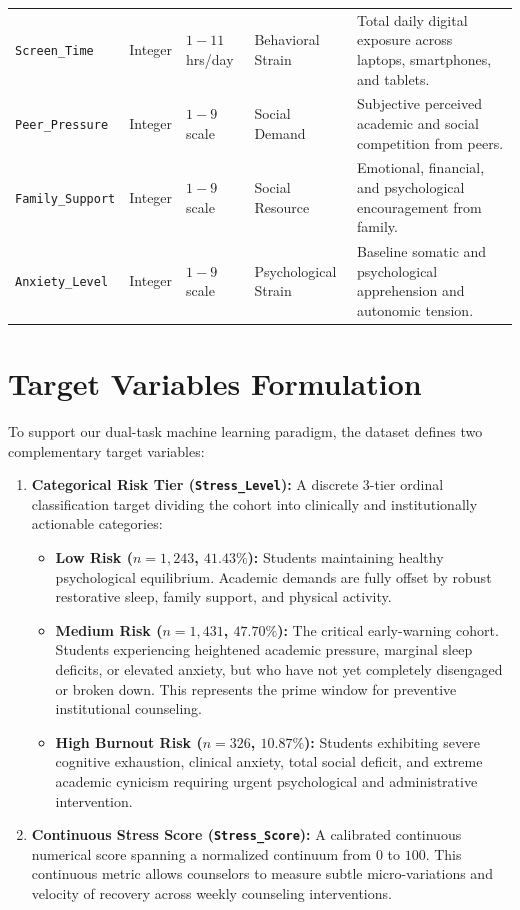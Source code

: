 \documentclass[12pt,a4paper,oneside]{report}
\begin{document}
\begin{table}[H]
\begin{tabularx}{\textwidth}{p{2.8cm}p{1.4cm}p{1.6cm}p{2.2cm}X}
\texttt{Screen\_Time} & Integer & $1 - 11$ hrs/day & Behavioral Strain & Total daily digital exposure across laptops, smartphones, and tablets. \\
\texttt{Peer\_Pressure} & Integer & $1 - 9$ scale & Social Demand & Subjective perceived academic and social competition from peers. \\
\texttt{Family\_Support} & Integer & $1 - 9$ scale & Social Resource & Emotional, financial, and psychological encouragement from family. \\
\texttt{Anxiety\_Level} & Integer & $1 - 9$ scale & Psychological Strain & Baseline somatic and psychological apprehension and autonomic tension. \\
\bottomrule
\end{tabularx}
\end{table}

\section{Target Variables Formulation}
\label{sec:target_variables}
To support our dual-task machine learning paradigm, the dataset defines two complementary target variables:
\begin{enumerate}
    \item \textbf{Categorical Risk Tier (\texttt{Stress\_Level}):} A discrete 3-tier ordinal classification target dividing the cohort into clinically and institutionally actionable categories:
    \begin{itemize}
        \item \textbf{Low Risk ($n = 1,243$, $41.43\%$):} Students maintaining healthy psychological equilibrium. Academic demands are fully offset by robust restorative sleep, family support, and physical activity.
        \item \textbf{Medium Risk ($n = 1,431$, $47.70\%$):} The critical early-warning cohort. Students experiencing heightened academic pressure, marginal sleep deficits, or elevated anxiety, but who have not yet completely disengaged or broken down. This represents the prime window for preventive institutional counseling.
        \item \textbf{High Burnout Risk ($n = 326$, $10.87\%$):} Students exhibiting severe cognitive exhaustion, clinical anxiety, total social deficit, and extreme academic cynicism requiring urgent psychological and administrative intervention.
    \end{itemize}
    \item \textbf{Continuous Stress Score (\texttt{Stress\_Score}):} A calibrated continuous numerical score spanning a normalized continuum from $0$ to $100$. This continuous metric allows counselors to measure subtle micro-variations and velocity of recovery across weekly counseling interventions.
\end{enumerate}
\end{document}
